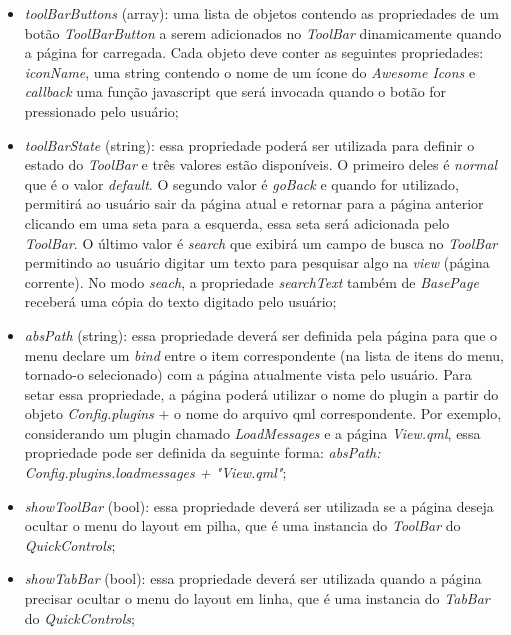 \begin{itemize}
	\item \textit{toolBarButtons} (array): uma lista de objetos contendo as propriedades de um botão \textit{ToolBarButton} a serem adicionados no \textit{ToolBar} dinamicamente quando a página for carregada. Cada objeto deve conter as seguintes propriedades: \textit{iconName}, uma string contendo o nome de um ícone do \textit{Awesome Icons} e \textit{callback} uma função javascript que será invocada quando o botão for pressionado pelo usuário;

	\item \textit{toolBarState} (string): essa propriedade poderá ser utilizada para definir o estado do \textit{ToolBar} e três valores estão disponíveis. O primeiro deles é \textit{normal} que é o valor \textit{default}. O segundo valor é \textit{goBack} e quando for utilizado, permitirá ao usuário sair da página atual e retornar para a página anterior clicando em uma seta para a esquerda, essa seta será adicionada pelo \textit{ToolBar}. O último valor é \textit{search} que exibirá um campo de busca no \textit{ToolBar} permitindo ao usuário digitar um texto para pesquisar algo na \textit{view} (página corrente). No modo \textit{seach}, a propriedade \textit{searchText} também de \textit{BasePage} receberá uma cópia do texto digitado pelo usuário;

	\item \textit{absPath} (string): essa propriedade deverá ser definida pela página para que o menu declare um \textit{bind} entre o item correspondente (na lista de itens do menu, tornado-o selecionado) com a página atualmente vista pelo usuário. Para setar essa propriedade, a página poderá utilizar o nome do plugin a partir do objeto \textit{Config.plugins} + o nome do arquivo qml correspondente. Por exemplo, considerando um plugin chamado \textit{LoadMessages} e a página \textit{View.qml}, essa propriedade pode ser definida da seguinte forma: \textit{absPath: Config.plugins.loadmessages + "View.qml"};

	\item \textit{showToolBar} (bool): essa propriedade deverá ser utilizada se a página deseja ocultar o menu do layout em pilha, que é uma instancia do \textit{ToolBar} do \textit{QuickControls};

	\item \textit{showTabBar} (bool): essa propriedade deverá ser utilizada quando a página precisar ocultar o menu do layout em linha, que é uma instancia do \textit{TabBar} do \textit{QuickControls};


\end{itemize}
